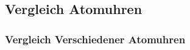 

\newcommand{\CommonElementTextFormat}[4]
{
  \begin{minipage}{2.2cm}
    \centering
      {\textbf{#1} \hfill #2}%
      \linebreak \linebreak
      {\textbf{#3}}%
      \linebreak \linebreak
      {{#4}}
  \end{minipage}
}

\newcommand{\NaturalElementTextFormat}[4]
{
  \CommonElementTextFormat{#1}{#2}{\Huge {#3}}{#4}
}


\newcommand{\SyntheticElementTextFormat}[4]
{
  \CommonElementTextFormat{#1}{#2}{\Huge #3}{#4}
}



\subsection{Vergleich Atomuhren}

\begin{frame}
  \frametitle{Vergleich Verschiedener Atomuhren}
    
\end{frame}

